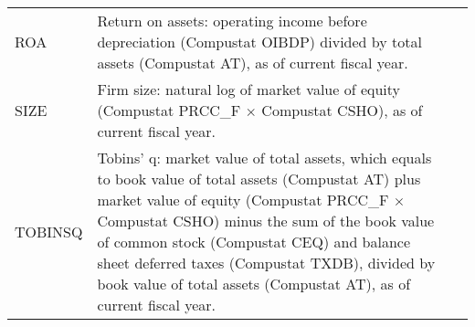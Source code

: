 \documentclass[a4paper]{article}
\begin{document}
\begin{table}[H]
\begin{tabular}{lp{15cm}p{15cm}}
		ROA   & Return on assets: operating income before depreciation (Compustat OIBDP) divided by total assets (Compustat AT), as of current fiscal year. \\
		SIZE  & Firm size: natural log of market value of equity (Compustat PRCC\_F $\times$ Compustat CSHO), as of current fiscal year. \\
		TOBINSQ & Tobins' q: market value of total assets, which equals to book value of total assets (Compustat AT) plus market value of equity (Compustat PRCC\_F $\times$ Compustat CSHO) minus the sum of the book value of common stock (Compustat CEQ) and balance sheet deferred taxes (Compustat TXDB), divided by book value of total assets (Compustat AT), as of current fiscal year. \\
	\end{tabular}%
\end{table}%
\end{document}
